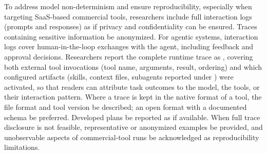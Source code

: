 To address model non-determinism and ensure reproducibility, especially when targeting SaaS-based commercial tools, researchers \should include full interaction logs (prompts and responses) as \supplementarymaterial if privacy and confidentiality can be ensured. Traces containing sensitive information \must be anonymized. For agentic systems, interaction logs \should cover human-in-the-loop exchanges with the agent, including feedback and approval decisions. Researchers \should report the complete runtime trace as \supplementarymaterial, covering both external tool invocations (tool name, arguments, result, ordering) and which configured artifacts (skills, context files, subagents reported under \design) were activated, so that readers can attribute task outcomes to the model, the tools, or their interaction pattern. Where a trace is kept in the native format of a tool, the file format and tool version \must be described; an open format with a documented schema \should be preferred. Developed plans \should be reported as \supplementarymaterial if available. When full trace disclosure is not feasible, representative or anonymized examples \should be provided, and unobservable aspects of commercial-tool runs \must be acknowledged as reproducibility limitations.
